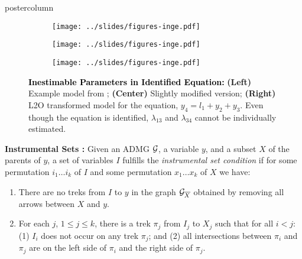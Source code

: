 \documentclass{beamer}
\newlength{\columnheight}
\begin{document}
\begin{frame}
\begin{columns}
	\begin{column}{0.33\textwidth}
		\begin{beamercolorbox}[center]{postercolumn}
			\begin{minipage}{.98\textwidth} %
				\parbox[t][\columnheight]{\textwidth}{ %
				\begin{myblock}{}
					\begin{figure}
						\begin{subfigure}{0.33 \linewidth}
							\centering
							\texttt{[image: ../slides/figures-inge.pdf]}
						\end{subfigure}%
						\begin{subfigure}{0.33 \linewidth}
							\centering
							\texttt{[image: ../slides/figures-inge.pdf]}
						\end{subfigure}%
						\begin{subfigure}{0.33 \linewidth}
							\centering
							\texttt{[image: ../slides/figures-inge.pdf]}
						\end{subfigure}
						\caption*{\textbf{\textcolor{black}{Inestimable Parameters in Identified Equation:}} \textbf{(Left)} Example model 
						from \citet{griliches1977estimating}; \textbf{(Center)} Slightly modified version; \textbf{(Right)} L2O transformed
						model for the equation, $ y_4 = l_1 + y_2 + y_3 $. Even though the equation is identified, $ \lambda_{13} $ and 
						$ \lambda_{34} $ cannot be individually estimated.}
					\end{figure}
				\end{myblock}
	\begin{myblock}{}
		\textbf{Instrumental Sets \citep{BritoP02}:}
		Given an ADMG $\cal
			G$, a variable $y$, and a subset $X$ of the parents of $y$, 
			a set of variables
			$I$ fulfills the 
			\emph{instrumental set condition}
			if for {some} permutation $ i_1 \ldots i_k $ of
			$ I $ and {some} permutation
			$ x_1 \ldots x_k $ of $ X $ we have: 
			\begin{enumerate}
				\item There are no treks from $I$ to $y$ in the graph ${\cal
					G}_{\overline{X}}$ obtained by removing all arrows 
					between $X$ and $y$. 
				\item For each $j$, $1 \leq j \leq k$, there is a trek $\pi_j$ from
					$I_j$ to $X_j$ such that for all $i < j$: (1) $I_i$ does not
					occur on any trek $\pi_j$; and (2) all intersections between
					$\pi_i$ and $\pi_j$ are on the left side of $\pi_i$ and the
					right side of $\pi_j$.
			\end{enumerate}
		\vspace{1em}


\end{myblock}}
\end{minipage}
\end{beamercolorbox}
\end{column}
\end{columns}
\end{frame}
\end{document}
